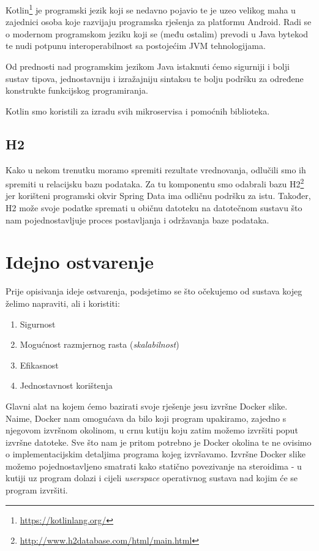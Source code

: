 \documentclass[times, utf8, zavrsni]{fer}
\begin{document}
Kotlin{\footnote{\url{https://kotlinlang.org/}}} je programski jezik koji se nedavno pojavio te je uzeo velikog maha u zajednici osoba koje razvijaju programska rješenja za platformu Android. Radi se o modernom programskom jeziku koji se (među ostalim) prevodi u Java bytekod te nudi potpunu interoperabilnost sa postojećim JVM tehnologijama.

Od prednosti nad programskim jezikom Java istaknuti ćemo sigurniji i bolji sustav tipova, jednostavniju i izražajniju sintaksu te bolju podršku za određene konstrukte funkcijskog programiranja.

Kotlin smo koristili za izradu svih mikroservisa i pomoćnih biblioteka. 

\subsection{H2}

Kako u nekom trenutku moramo spremiti rezultate vrednovanja, odlučili smo ih spremiti u relacijsku bazu podataka. Za tu komponentu smo odabrali bazu H2{\footnote{\url{http://www.h2database.com/html/main.html}}} jer korišteni programski okvir Spring Data ima odličnu podršku za istu. Također, H2 može svoje podatke spremati u običnu datoteku na datotečnom sustavu što nam pojednostavljuje proces postavljanja i održavanja baze podataka.

\section{Idejno ostvarenje}

Prije opisivanja ideje ostvarenja, podsjetimo se što očekujemo od sustava kojeg želimo napraviti, ali i koristiti:

\begin{enumerate}
\item Sigurnost
\item Mogućnost razmjernog rasta (\textit{skalabilnost})
\item Efikasnost
\item Jednostavnost korištenja
\end{enumerate}

Glavni alat na kojem ćemo bazirati svoje rješenje jesu izvršne Docker slike. Naime, Docker nam omogućava da bilo koji program upakiramo, zajedno s njegovom izvršnom okolinom, u crnu kutiju koju zatim možemo izvršiti poput izvršne datoteke. Sve što nam je pritom potrebno je Docker okolina te ne ovisimo o implementacijskim detaljima programa kojeg izvršavamo. Izvršne Docker slike možemo pojednostavljeno smatrati kako statično povezivanje na steroidima - u kutiji uz program dolazi i cijeli \textit{userspace} operativnog sustava nad kojim će se program izvršiti.
\end{document}
